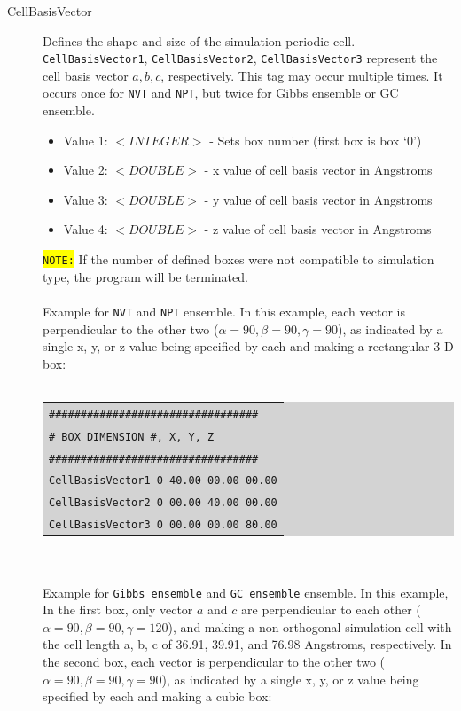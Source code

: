 \begin{description}
\item [CellBasisVector] Defines the shape and size of the simulation periodic cell. \texttt{CellBasisVector1}, \texttt{CellBasisVector2}, \texttt{CellBasisVector3} represent the cell basis vector $a, b, c$, respectively. This tag may occur multiple times.  It occurs once for \texttt{NVT} and \texttt{NPT}, but twice for Gibbs ensemble or GC ensemble.
	\begin{itemize}
	\item Value 1: $<INTEGER>$ - Sets box number (first box is box `0')
	\item Value 2: $<DOUBLE>$ - x value of cell basis vector in Angstroms
	\item Value 3: $<DOUBLE>$ - y value of cell basis vector in Angstroms
	\item Value 4: $<DOUBLE>$ - z value of cell basis vector in Angstroms
	\end{itemize}
	\colorbox{yellow}{\texttt{NOTE:}} If the number of defined boxes were not compatible to simulation type, the program will be terminated.\\\\
	Example for \texttt{NVT} and \texttt{NPT} ensemble. In this example, each vector is perpendicular to the other two ($\alpha = 90, \beta = 90, \gamma = 90$), as indicated by a single x, y, or z value being specified by each and making a rectangular 3-D box:\\\\
	\colorbox{lightgray}{
	\begin{tabular}{l}
	\texttt{\#\#\#\#\#\#\#\#\#\#\#\#\#\#\#\#\#\#\#\#\#\#\#\#\#\#\#\#\#\#\#\#\#}\\
	\texttt{\#  BOX DIMENSION \#, X, Y, Z}\\
	\texttt{\#\#\#\#\#\#\#\#\#\#\#\#\#\#\#\#\#\#\#\#\#\#\#\#\#\#\#\#\#\#\#\#\#}\\
	\texttt{CellBasisVector1 0  40.00 00.00 00.00}\\
	\texttt{CellBasisVector2 0    00.00 40.00  00.00}\\
	\texttt{CellBasisVector3 0    00.00 00.00  80.00}\\
	\end{tabular}}\\\\
	Example for \texttt{Gibbs ensemble} and \texttt{GC ensemble} ensemble. In this example,  In the first box, only vector $a$ and $c$ are perpendicular to each other ($\alpha = 90, \beta = 90, \gamma = 120$), and making a non-orthogonal simulation cell with the cell length a, b, c of 36.91, 39.91, and 76.98 Angstroms, respectively. In the second box, each vector is perpendicular to the other two ($\alpha = 90, \beta = 90, \gamma = 90$), as indicated by a single x, y, or z value being specified by each and making a cubic box:\\\\

\end{description}
